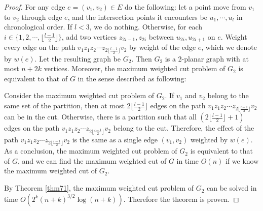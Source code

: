 \documentclass[10pt,fleqn]{article}
\begin{document}
	\begin{proof}
		For any edge $e=(v_1,v_2)\in E$ do the following: let a point move from $v_1$ to $v_2$ through edge $e$, and the intersection points it encounters be $u_1,\cdots,u_l$ in chronological order. If $l<3$, we do nothing. Otherwise, for each $i\in\{1,2,\cdots,\lfloor\frac{l-1}{2}\rfloor\}$, add two vertices $z_{2i-1},z_{2i}$ between $u_{2i},u_{2i+1}$ on $e$. Weight every edge on the path $v_1z_1z_2\cdots z_{2\lfloor\frac{l-1}{2}\rfloor}v_2$ by weight of the edge $e$, which we denote by $w(e)$. Let the resulting graph be $G_2$. Then $G_2$ is a 2-planar graph with at most $n+2k$ vertices. Moreover, the maximum weighted cut problem of $G_2$ is equivalent to that of $G$ in the sense described as following: \par
		Consider the maximum weighted cut problem of $G_2$. If $v_1$ and $v_2$ belong to the same set of the partition, then at most $2\lfloor\frac{l-1}{2}\rfloor$ edges on the path $v_1z_1z_2\cdots z_{2\lfloor\frac{l-1}{2}\rfloor}v_2$ can be in the cut. Otherwise, there is a partition such that all $(2\lfloor\frac{l-1}{2}\rfloor+1)$ edges on the path $v_1z_1z_2\cdots z_{2\lfloor\frac{l-1}{2}\rfloor}v_2$ belong to the cut. Therefore, the effect of the path $v_1z_1z_2\cdots z_{2\lfloor\frac{l-1}{2}\rfloor}v_2$ is the same as a single edge $(v_1,v_2)$ weighted by $w(e)$. As a conclusion, the maximum weighted cut problem of $G_2$ is equivalent to that of $G$, and we can find the maximum weighted cut of $G$ in time $O(n)$ if we know the maximum weighted cut of $G_2$. \par
		By Theorem \ref{thm71}, the maximum weighted cut problem of $G_2$ can be solved in time $O(2^k(n+k)^{3/2}\log (n+k))$. Therefore the theorem is proven.
	\end{proof}
	
	
\end{document}
